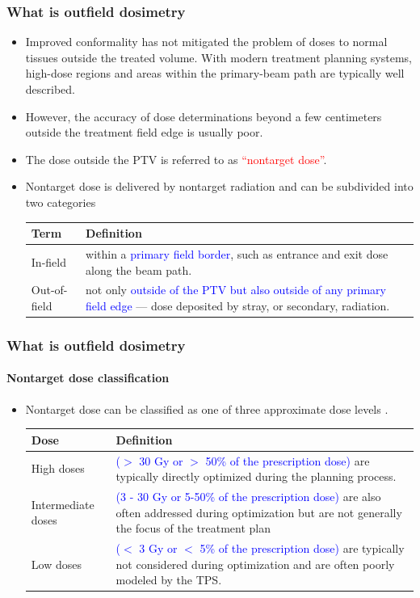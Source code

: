 \documentclass{beamer}
\begin{document}
\begin{frame}
  \frametitle{What is outfield dosimetry}
  \begin{itemize}
    \justifying
    \item Improved conformality has not mitigated the problem of doses to normal tissues outside the treated volume. With modern treatment planning systems, high-dose regions and areas within the primary-beam path are typically well described.
    \item However, the accuracy of dose determinations beyond a few centimeters outside the treatment field edge is usually poor. \cite{huang_accuracy_2013}
    \item The dose outside the PTV is referred to as \textcolor{red}{“nontarget dose”}.
    \item Nontarget dose is delivered by nontarget radiation and can be subdivided into two categories
    \begin{table}
    \begin{tabular}{p{2cm}|p{8cm}}
      \hline\hline
      Term & Definition \\
      \hline 
      In-field & within a \textcolor{blue}{primary field border}, such as entrance and exit dose along the beam path. \\
      \hline
      Out-of-field & not only \textcolor{blue}{outside of the PTV but also outside of any primary field edge} — dose deposited by stray, or secondary, radiation. \\
      \hline\hline
    \end{tabular}
    \end{table}
  \end{itemize}
\end{frame}




% 
\begin{frame}
  \frametitle{What is outfield dosimetry}
  \framesubtitle{Nontarget dose classification}
  \begin{itemize}
    \item Nontarget dose can be classified as one of three approximate dose levels \cite{kry_span_2017}.
    \begin{tabular}{p{2cm}|p{8cm}}
      \hline\hline
      Dose & Definition \\
      \hline 
      High doses & \textcolor{blue}{($>$ 30 Gy or $>$ 50\% of the prescription dose)} are typically directly optimized during the planning process. \\
      \hline
      Intermediate doses & \textcolor{blue}{(3 - 30 Gy or 5-50\% of the prescription dose)} are also often addressed during optimization but are not generally the focus of the treatment plan \\
      \hline
      Low doses & \textcolor{blue}{($<$ 3 Gy or $<$ 5\% of the prescription dose)} are typically not considered during optimization and are often poorly modeled by the TPS. \\
      \hline\hline
    \end{tabular}
  \end{itemize}
\end{frame}
\end{document}
